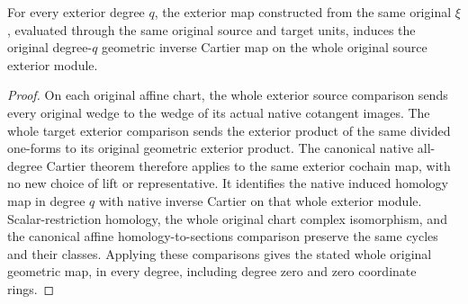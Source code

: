 \begin{theorem}
\label{thm:di-geometric-original-leading-cartier-exterior}
\leanok
For every exterior degree $q$, the exterior map constructed from the
same original $\xi$, evaluated through the same original source and
target units, induces the original degree-$q$ geometric inverse Cartier
map on the whole original source exterior module.
\end{theorem}
\begin{proof}
On each original affine chart, the whole exterior source comparison
sends every original wedge to the wedge of its actual native cotangent
images. The whole target exterior comparison sends the exterior
product of the same divided one-forms to its original geometric
exterior product. The canonical native all-degree Cartier theorem
therefore applies to the same exterior cochain map, with no new choice
of lift or representative. It identifies the native induced homology
map in degree $q$ with native inverse Cartier on that whole exterior
module. Scalar-restriction homology, the whole original chart complex
isomorphism, and the canonical affine homology-to-sections comparison
preserve the same cycles and their classes. Applying these comparisons
gives the stated whole original geometric map, in every degree,
including degree zero and zero coordinate rings.
\end{proof}

